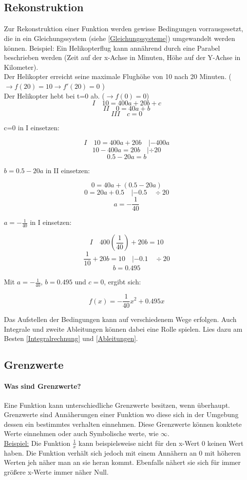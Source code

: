 \documentclass{article}
\begin{document}
	\subsection{Rekonstruktion}\label{Rekonstruktion}
		\paragraph{}
			Zur Rekonstruktion einer Funktion werden gewisse Bedingungen vorrausgesetzt, die in ein Gleichungssystem (siehe \ref{Gleichungssysteme}) umgewandelt werden können.
			Beispiel: Ein Helikopterflug kann annährend durch eine Parabel beschrieben werden (Zeit auf der x-Achse in Minuten, Höhe auf der Y-Achse in Kilometer). \\
			Der Helikopter erreicht seine maximale Flughöhe von 10 nach 20 Minuten. ( $ \rightarrow f(20)=10 \rightarrow f'(20)=0 $ ) \\
			Der Helikopter hebt bei t=0 ab. ($ \rightarrow f(0)=0$) \\
			
			\[ I \quad 10=400a+20b+c \]
			\[ II \quad 0=40a+b \]
			\[ III \quad c=0 \]
			
			c=0 in I einsetzen:
			
			\[I \quad 10=400a+20b \quad |-400a \]
			\[ 10-400a=20b \quad | \div 20\]
			\[ 0.5-20a=b\]
			
			$b= 0.5-20a $ in II einsetzen:
			
			\[ 0=40a+(0.5-20a)\]
			\[ 0=20a+0.5 \quad |-0.5 \quad \div 20\]
			\[ a=-\frac{1}{40} \]
			
			$a=-\frac{1}{40}$ in I einsetzen:
			
			\[ I \quad 400(\frac{1}{40})+20b=10 \]
			\[ \frac{1}{10}+20b=10 \quad |-0.1 \quad \div 20\]
			\[ b=0.495\]
			
			Mit $a=-\frac{1}{40}$, $b=0.495$ und $c=0$, ergibt sich:
			
			\[f(x)=-\frac{1}{40}x^2+0.495x\]
			
			Das Aufstellen der Bedingungen kann auf verschiedenem Wege erfolgen. Auch Integrale und zweite Ableitungen können dabei eine Rolle spielen.
			Lies dazu am Besten \ref{Integralrechnung} und \ref{Ableitungen}.


	\subsection{Grenzwerte}
		\paragraph{Was sind Grenzwerte?} \label{Definitionsbereich}
			Eine Funktion kann unterschiedliche Grenzwerte besitzen, wenn überhaupt. Grenzwerte sind Annäherungen einer Funktion wo diese sich in der Umgebung dessen ein bestimmtes verhalten einnehmen. Diese Grenzwerte können konktete Werte einnehmen oder auch Symbolische werte, wie $\infty$. \\
			\underline{Beispiel:} Die Funktion $ \frac {1} {x}$ kann beispielsweise nicht für den x-Wert $0$ keinen Wert haben. Die Funktion verhält sich jedoch mit einem Annähern an $0$ mit höheren Werten jeh näher man an sie heran kommt. Ebenfalls nähert sie sich für immer größere x-Werte immer näher Null.
			
\end{document}
